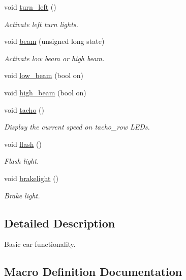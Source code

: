 \begin{DoxyCompactItemize}
void \hyperlink{group__car_ga0565ad7a822d9d334bb50c088af22361}{turn\+\_\+left} ()
\begin{DoxyCompactList}\small\item\em Activate left turn lights. \end{DoxyCompactList}\item 
void \hyperlink{group__car_ga6b1fd674445dd1c654dfe8b8b65f168e}{beam} (unsigned long state)
\begin{DoxyCompactList}\small\item\em Activate low beam or high beam. \end{DoxyCompactList}\item 
void \hyperlink{group__car_ga29d5eff542aae0196b8e84b8a752e1df}{low\+\_\+beam} (bool on)
\item 
void \hyperlink{group__car_ga1088d06b4ab015d579e0ac2510d39f25}{high\+\_\+beam} (bool on)
\item 
void \hyperlink{group__car_gac7295d1018b2b948084ba5dbacf09d74}{tacho} ()
\begin{DoxyCompactList}\small\item\em Display the current speed on tacho\+\_\+row L\+E\+Ds. \end{DoxyCompactList}\item 
void \hyperlink{group__car_gaffb7c011f82f3fb47b39ebb2713a1cd8}{flash} ()
\begin{DoxyCompactList}\small\item\em Flash light. \end{DoxyCompactList}\item 
void \hyperlink{group__car_ga1ac48972153097ad7a16fffc032fc5f1}{brakelight} ()
\begin{DoxyCompactList}\small\item\em Brake light. \end{DoxyCompactList}\end{DoxyCompactItemize}


\subsection{Detailed Description}
Basic car functionality. 



\subsection{Macro Definition Documentation}
